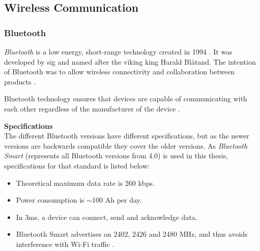 \subsection{Wireless Communication}
\subsubsection{Bluetooth}
\textit{Bluetooth} is a low energy, short-range technology created in 1994 \cite{ble2016}. It was developed by \acrshort{sig} and named after the viking king Harald Blåtand. The intention of Bluetooth was to allow wireless connectivity and collaboration between products \cite{bluetoothsig2016}.

Bluetooth technology ensures that devices are capable of communicating with each other regardless of the manufacturer of the device \cite{prabhu2004}.  

\textbf{Specifications}
\\
The different Bluetooth versions have different specifications, but as the newer versions are backwards compatible \cite{bluetoothreport2013} they cover the older versions. As \textit{Bluetooth Smart} (represents all Bluetooth versions from 4.0) is used in this thesis, specifications for that standard is listed below:

\begin{itemize}
    \item Theoretical maximum data rate is 260 kbps.
    \item Power consumption is $\sim$100 \micro Ah per day.
    \item In 3ms, a device can connect, send and acknowledge data.
    \item Bluetooth Smart advertises on 2402, 2426 and 2480 MHz, and thus avoids interference with Wi-Fi traffic \cite{csr2010}.
\end{itemize}